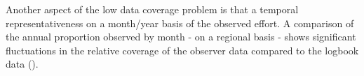 \documentclass[12pt]{SCreport}
\begin{document}
Another aspect of the low data coverage problem is that a temporal representativeness on a month/year basis of the observed effort. A comparison of the annual proportion observed by month - on a regional basis - shows significant fluctuations in the relative coverage of the observer data compared to the logbook data ().

\begin{comment}

   



\end{comment}
\end{document}
